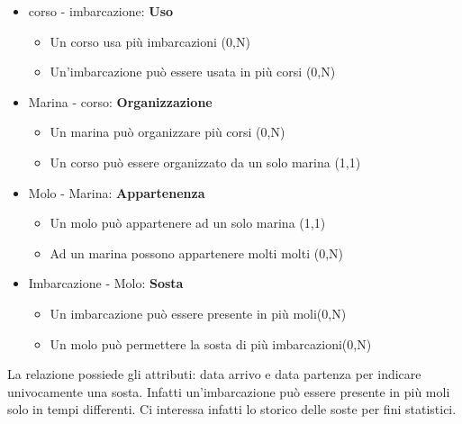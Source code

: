\begin{itemize}
    \item corso - imbarcazione: \textbf{Uso}
    \begin{itemize}
        \item Un corso usa più imbarcazioni (0,N)
        \item Un'imbarcazione può essere usata in più corsi (0,N)
    \end{itemize}
    
    \item Marina - corso: \textbf{Organizzazione}
    \begin{itemize}
        \item Un marina può organizzare più corsi (0,N)
        \item Un corso può essere organizzato da un solo marina (1,1)
    \end{itemize}
    
    \item Molo - Marina: \textbf{Appartenenza}
    \begin{itemize}
        \item Un molo può appartenere ad un solo marina (1,1)
        \item Ad un marina possono appartenere molti molti (0,N)
    \end{itemize}
    
    \item Imbarcazione - Molo: \textbf{Sosta}
    \begin{itemize}
        \item Un imbarcazione può essere presente in più moli(0,N)
        \item Un molo può permettere la sosta di più imbarcazioni(0,N)
    \end{itemize}
\end{itemize}

La relazione possiede gli attributi: data arrivo e data partenza per indicare univocamente una sosta. Infatti un'imbarcazione può essere presente in più moli solo in tempi differenti. Ci interessa infatti lo storico delle soste per fini statistici.

